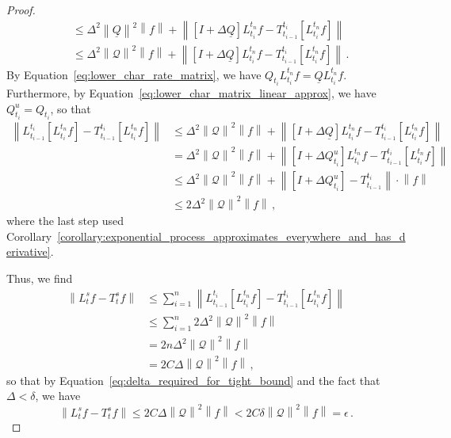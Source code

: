 \documentclass[10pt]{paper}
\newcommand{\lrate}{\underline{Q}}
\newcommand{\norm}[1]{\left\lVert #1 \right\rVert}
\begin{document}
\begin{proof}
\begin{align*}
&\leq \Delta^2\norm{\lrate}^2\norm{f} + \norm{\left[I+\Delta\lrate\right]L_{t_i}^{t_n}f - T_{t_{i-1}}^{t_i}\left[L_{t_i}^{t_n}f\right]} \\
&\leq \Delta^2\norm{\mathcal{Q}}^2\norm{f} + \norm{\left[I+\Delta\lrate\right]L_{t_i}^{t_n}f - T_{t_{i-1}}^{t_i}\left[L_{t_i}^{t_n}f\right]}\,.
\end{align*}
By Equation~\eqref{eq:lower_char_rate_matrix}, we have $Q_{t_i}L_{t_i}^{t_n}f = \lrate L_{t_i}^{t_n}f$. Furthermore, by Equation~\eqref{eq:lower_char_matrix_linear_approx}, we have $Q_{t_i}^u=Q_{t_i}$, so that
\begin{align*}
\norm{L_{t_{i-1}}^{t_i}\left[L_{t_i}^{t_n}f\right] - T_{t_{i-1}}^{t_i}\left[L_{t_i}^{t_n}f\right]} &\leq \Delta^2\norm{\mathcal{Q}}^2\norm{f} + \norm{\left[I+\Delta\lrate\right]L_{t_i}^{t_n}f - T_{t_{i-1}}^{t_i}\left[L_{t_i}^{t_n}f\right]} \\
 &= \Delta^2\norm{\mathcal{Q}}^2\norm{f} + \norm{\left[I+\Delta Q_{t_i}^u\right]L_{t_i}^{t_n}f - T_{t_{i-1}}^{t_i}\left[L_{t_i}^{t_n}f\right]} \\
 &\leq \Delta^2\norm{\mathcal{Q}}^2\norm{f} + \norm{\left[I+\Delta Q_{t_i}^u\right] - T_{t_{i-1}}^{t_i}}\cdot\norm{f}\\
 &\leq 2\Delta^2\norm{\mathcal{Q}}^2\norm{f}\,,
\end{align*}
where the last step used Corollary~\ref{corollary:exponential_process_approximates_everywhere_and_has_derivative}.

Thus, we find
\begin{align*}
\norm{L_t^sf - T_t^sf} &\leq \sum_{i=1}^n \norm{L_{t_{i-1}}^{t_i}\left[L_{t_i}^{t_n}f\right] - T_{t_{i-1}}^{t_i}\left[L_{t_i}^{t_n}f\right]} \\
 &\leq \sum_{i=1}^n 2\Delta^2\norm{\mathcal{Q}}^2\norm{f} \\
 &= 2n\Delta^2\norm{\mathcal{Q}}^2\norm{f} \\
 &= 2C\Delta\norm{\mathcal{Q}}^2\norm{f}\,,
\end{align*}
so that by Equation~\eqref{eq:delta_required_for_tight_bound} and the fact that $\Delta<\delta$, we have
\begin{equation*}
\norm{L_t^sf - T_t^sf} \leq 2C\Delta\norm{\mathcal{Q}}^2\norm{f} < 2C\delta\norm{\mathcal{Q}}^2\norm{f} = \epsilon\,.
\end{equation*}
\end{proof}
\end{document}
